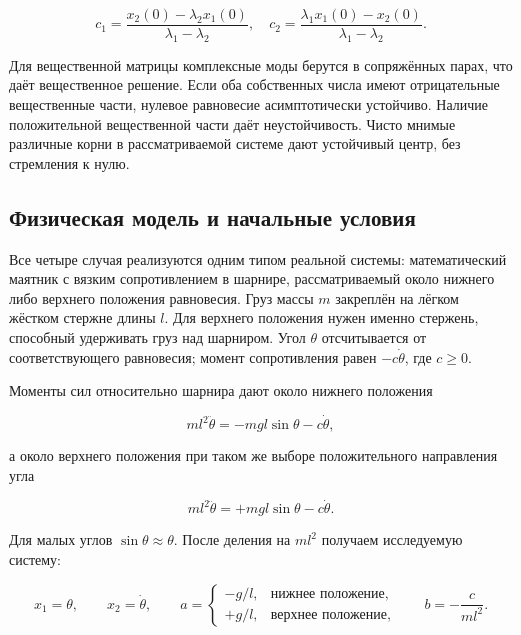 \documentclass[a4paper,14pt]{extarticle}
\begin{document}
\begin{equation}
c_1=\frac{x_2(0)-\lambda_2x_1(0)}{\lambda_1-\lambda_2},\quad
c_2=\frac{\lambda_1x_1(0)-x_2(0)}{\lambda_1-\lambda_2}.
\end{equation}

Для вещественной матрицы комплексные моды берутся в сопряжённых парах, что даёт вещественное решение. Если оба собственных числа имеют отрицательные вещественные части, нулевое равновесие асимптотически устойчиво. Наличие положительной вещественной части даёт неустойчивость. Чисто мнимые различные корни в рассматриваемой системе дают устойчивый центр, без стремления к нулю.

\subsection{Физическая модель и начальные условия}

Все четыре случая реализуются одним типом реальной системы: математический маятник с вязким сопротивлением в шарнире, рассматриваемый около нижнего либо верхнего положения равновесия. Груз массы $m$ закреплён на лёгком жёстком стержне длины $l$. Для верхнего положения нужен именно стержень, способный удерживать груз над шарниром. Угол $\theta$ отсчитывается от соответствующего равновесия; момент сопротивления равен $-c\dot\theta$, где $c\geq0$.

Моменты сил относительно шарнира дают около нижнего положения

\begin{equation}
ml^2\ddot\theta=-mgl\sin\theta-c\dot\theta,
\end{equation}

а около верхнего положения при таком же выборе положительного направления угла

\begin{equation}
ml^2\ddot\theta=+mgl\sin\theta-c\dot\theta.
\end{equation}

Для малых углов $\sin\theta\approx\theta$. После деления на $ml^2$ получаем исследуемую систему:

\begin{equation}
x_1=\theta,\qquad x_2=\dot\theta,\qquad
a=\begin{cases}-g/l,&\text{нижнее положение},\\+g/l,&\text{верхнее положение},\end{cases}
\qquad b=-\frac{c}{ml^2}.
\end{equation}
\end{document}

